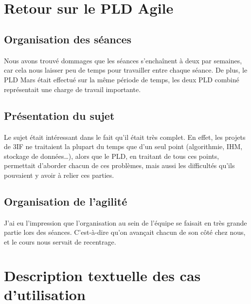 \documentclass[a4paper,10pt]{article}
\begin{document}
\begin{titlepage}
  
\end{titlepage}
\tableofcontents
\pagebreak

\listoffigures
\pagebreak


\section{Retour sur le PLD Agile}
\subsection{Organisation des séances}
\paragraph{}
Nous avons trouvé dommages que les séances s’enchaînent à deux par semaines, car cela nous laisser peu de temps pour travailler entre chaque séance. De plus, le PLD Mars était effectué sur la même période de temps, les deux PLD combiné représentait une charge de travail importante. 

\subsection{Présentation du sujet}
\paragraph{}
Le sujet était intéressant dans le fait qu’il était très complet. En effet, les projets de 3IF ne traitaient la plupart du temps que d’un seul point (algorithmie, IHM, stockage de données…), alors que le PLD, en traitant de tous ces points, permettait d’aborder chacun de ces problèmes, mais aussi les difficultés qu’ils pouvaient y avoir à relier ces parties.

\subsection{Organisation de l’agilité}
\paragraph{}
J’ai eu l’impression que l’organisation au sein de l’équipe se faisait en très grande partie lors des séances. C’est-à-dire qu’on avançait chacun de son côté chez nous, et le cours nous servait de recentrage. 

\FloatBarrier
\section{Description textuelle des cas d’utilisation}
  
  
   
   
   
\end{document}
